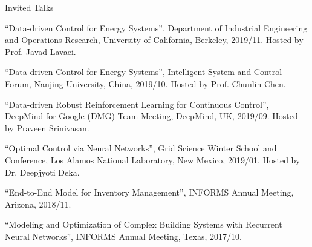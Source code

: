 \documentclass{resume} %
\begin{document}
\begin{rSection}{Invited Talks}  
	\begin{enumerate}[wide, label={[\arabic*]. }, labelindent=0pt]
	\item ``{Data-driven Control for Energy Systems}'', Department of Industrial Engineering and Operations Research, University of California, Berkeley, 2019/11. Hosted by Prof. Javad Lavaei.
	
	\item ``{Data-driven Control for Energy Systems}'', Intelligent System and Control Forum, Nanjing University, China, 2019/10. Hosted by Prof. Chunlin Chen.
	
	\item ``{Data-driven Robust Reinforcement Learning for Continuous Control}'', DeepMind for Google (DMG) Team Meeting, DeepMind, UK, 2019/09. Hosted by Praveen Srinivasan.
	
	\item ``{Optimal Control via Neural Networks}'', Grid Science Winter School and Conference, Los Alamos National Laboratory, New Mexico, 2019/01. Hosted by Dr. Deepjyoti Deka.
	
	\item ``{End-to-End Model for Inventory Management}'', INFORMS Annual Meeting, Arizona, 2018/11.
	
	\item ``{Modeling and Optimization of Complex Building Systems with Recurrent Neural Networks}'', INFORMS Annual Meeting, Texas, 2017/10.
	\end{enumerate}
\end{rSection}
\end{document}
